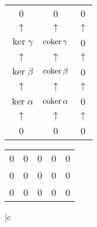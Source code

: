 \documentclass[../main.tex]{subfiles}
\begin{document}
\begin{table}[h]
\begin{minipage}{.4\linewidth}
\centering
\begin{tabular}{ |c c c } 
 0 & 0 & 0 \\ 
 $\uparrow$   &	 $\uparrow$   & $\uparrow$   \\
 $\ker\gamma$ & $\operatorname{coker}\gamma$ & 0 \\
 $\uparrow$   &	 $\uparrow$   & $\uparrow$   \\
 $\ker\beta$ & $\operatorname{coker}\beta$ & 0 \\
 $\uparrow$   &	 $\uparrow$   & $\uparrow$   \\
 $\ker\alpha$ & $\operatorname{coker}\alpha$ & 0 \\
 $\uparrow$   &	 $\uparrow$   & $\uparrow$   \\
 0 & 0 & 0 \\ 
 \hline
\end{tabular}
\end{minipage}
\begin{minipage}{.4\linewidth}
\centering
\begin{tabular}{ |c c c c c} 
 0 & 0 & 0 & 0 & 0\\ 
 0 & 0 & 0 & 0 & 0\\
 0 & 0 & 0 & 0 & 0 \\
 \hline
\end{tabular}
\end{minipage}
\end{table}

\begin{table}[h]
\begin{minipage}{.3\linewidth}
\centering
\begin{tabular}{ |c  } 
\bee
{}
\eee\\
 \hline
\end{tabular}
\end{minipage}
\end{table}
\end{document}
